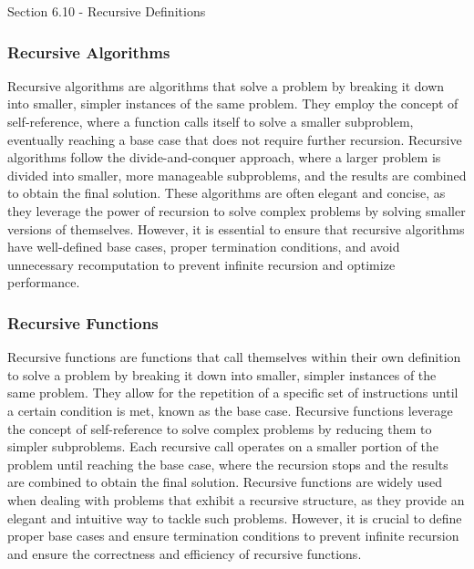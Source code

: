 \begin{notes}{Section 6.10 - Recursive Definitions}
    \subsubsection*{Recursive Algorithms}

    Recursive algorithms are algorithms that solve a problem by breaking it down into smaller, simpler instances of the same problem. They employ the concept of self-reference, where a function calls itself to solve a smaller subproblem, eventually reaching a base case that does not require further recursion. Recursive algorithms follow the divide-and-conquer 
    approach, where a larger problem is divided into smaller, more manageable subproblems, and the results are combined to obtain the final solution. These algorithms are often elegant and concise, as they leverage the power of recursion to solve complex problems by solving smaller versions of themselves. However, it is essential to ensure that recursive algorithms 
    have well-defined base cases, proper termination conditions, and avoid unnecessary recomputation to prevent infinite recursion and optimize performance.
    
    \subsubsection*{Recursive Functions}
    
    Recursive functions are functions that call themselves within their own definition to solve a problem by breaking it down into smaller, simpler instances of the same problem. They allow for the repetition of a specific set of instructions until a certain condition is met, known as the base case. Recursive functions leverage the concept of self-reference to solve 
    complex problems by reducing them to simpler subproblems. Each recursive call operates on a smaller portion of the problem until reaching the base case, where the recursion stops and the results are combined to obtain the final solution. Recursive functions are widely used when dealing with problems that exhibit a recursive structure, as they provide an elegant 
    and intuitive way to tackle such problems. However, it is crucial to define proper base cases and ensure termination conditions to prevent infinite recursion and ensure the correctness and efficiency of recursive functions.
\end{notes}

